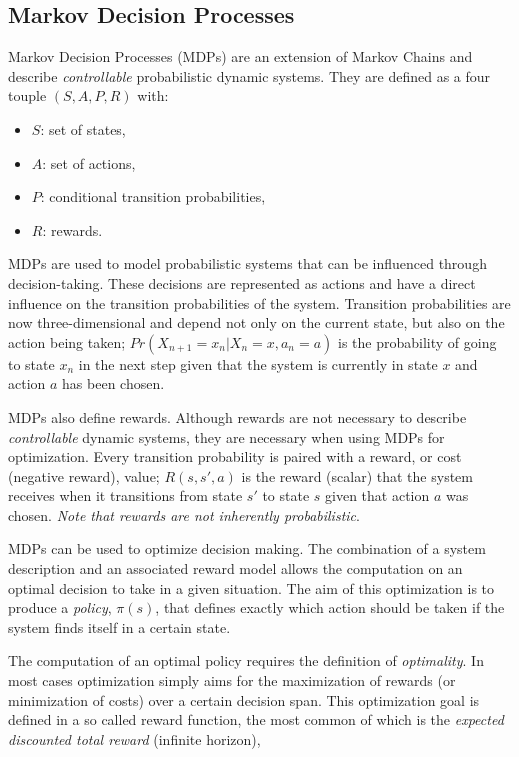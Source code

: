 \subsection{Markov Decision Processes}

Markov Decision Processes (MDPs) are an extension of Markov Chains and describe \textit{controllable} probabilistic dynamic systems. They are defined as a four touple $(S,A,P,R)$ with:
\begin{itemize}
\item $S$: set of states,
\item $A$: set of actions,
\item $P$: conditional transition probabilities,
\item $R$: rewards.
\end{itemize}

MDPs are used to model probabilistic systems that can be influenced through decision-taking. These decisions are represented as actions and have a direct influence on the transition probabilities of the system. Transition probabilities are now three-dimensional and depend not only on the current state, but also on the action being taken; $Pr(X_{n+1}=x_n|X_n=x,a_n=a)$ is the probability of going to state $x_n$ in the next step given that the system is currently in state $x$ and action $a$ has been chosen.

MDPs also define rewards. Although rewards are not necessary to describe \textit{controllable} dynamic systems, they are necessary when using MDPs for optimization. Every transition probability is paired with a reward, or cost (negative reward), value; $R(s,s',a)$ is the reward (scalar) that the system receives when it transitions from state $s'$ to state $s$ given that action $a$ was chosen. \textit{Note that rewards are not inherently probabilistic}.

MDPs can be used to optimize decision making. The combination of a system description and an associated reward model allows the computation on an optimal decision to take in a given situation. The aim of this optimization is to produce a \textit{policy}, $\pi(s)$, that defines exactly which action should be taken if the system finds itself in a certain state.

The computation of an optimal policy requires the definition of \textit{optimality}. In most cases optimization simply aims for the maximization of rewards (or minimization of costs) over a certain decision span. This optimization goal is defined in a so called reward function, the most common of which is the \textit{expected discounted total reward} (infinite horizon),

